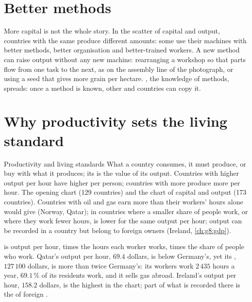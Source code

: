 \section{Better methods}

More capital is not the whole story. In the scatter of capital and output, countries with the
same  produce different amounts: some use their machines with better methods,
better organisation and better-trained workers. A new method can raise output without any new
machine: rearranging a workshop so that parts flow from one task to the next, as on the assembly
line of the photograph, or using a seed that gives more grain per hectare. , the
knowledge of methods, spreads: once a method is known, other  and countries can copy it.

\section{Why productivity sets the living standard}

\begin{model}{Productivity and living standards}
\assumes What a country consumes, it must produce, or buy with what it produces; its  is
the value of its output.
\predicts Countries with higher output per hour have higher  per person; countries with
more  produce more per hour.
\tested The opening chart (129 countries) and the chart of capital and output (173 countries).
\breaks Countries with oil and gas earn more than their workers' hours alone would give (Norway,
Qatar); in countries where a smaller share of people work, or where they work fewer hours,  is lower for the same output per hour; output can be recorded in a country but belong
to foreign owners (Ireland, \cref{ch:g8:gdp}).
\end{model}

 is output per hour, times the hours each worker works, times the share of
people who work. Qatar's output per hour, $69.4$ dollars, is below Germany's, yet its , $127\,100$ dollars, is more than twice Germany's: its workers work $2\,435$ hours a year,
$69.1\,\%$ of its residents work, and it sells gas abroad. Ireland's output per hour, $158.2$ dollars, is the highest
in the chart; part of what is recorded there is the  of foreign .

